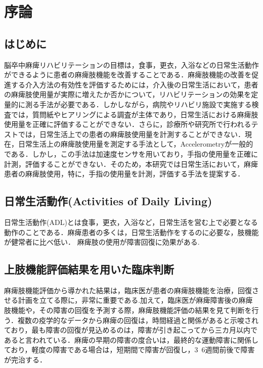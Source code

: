 \chapter{序論}

\section{はじめに}
脳卒中麻痺リハビリテーションの目標は，食事，更衣，入浴などの日常生活動作ができるように患者の麻痺肢機能を改善することである．麻痺肢機能の改善を促進する介入方法の有効性を評価するためには，介入後の日常生活において，患者の麻痺肢使用量が実際に増えたか否かについて，リハビリテーションの効果を定量的に測る手法が必要である．しかしながら，病院やリハビリ施設で実施する検査では，質問紙やヒアリングによる調査が主体であり，日常生活における麻痺肢使用量を正確に評価することができない．さらに，診療所や研究所で行われるテストでは，日常生活上での患者の麻痺肢使用量を計測することができない．現在，日常生活上の麻痺肢使用量を測定する手法として，Accelerometryが一般的である．しかし，この手法は加速度センサを用いており，手指の使用量を正確に計測，評価することができない．そのため，本研究では日常生活において，麻痺患者の麻痺肢使用，特に，手指の使用量を計測，評価する手法を提案する．

\section{日常生活動作(Activities of Daily Living)}
日常生活動作(ADL)とは食事，更衣，入浴など，日常生活を営む上で必要となる動作のことである．麻痺患者の多くは，日常生活動作をするのに必要な，肢機能が健常者に比べ低い．
麻痺肢の使用が障害回復に効果がある\cite{Zeiler2017}.




\section{上肢機能評価結果を用いた臨床判断}
麻痺肢機能評価から導かれた結果は，臨床医が患者の麻痺肢機能を治療，回復させる計画を立てる際に，非常に重要である\cite{Lang2013}.加えて，臨床医が麻痺障害後の麻痺肢機能や，その障害の回復を予測する際，麻痺肢機能評価の結果を見て判断を行う．複数の疫学的なデータから麻痺の回復は，時間経過と関係があると示唆されており，最も障害の回復が見込めるのは，障害が引き起こってから三カ月以内であると言われている．麻痺の早期の障害の度合いは，最終的な運動障害に関係しており，軽度の障害である場合は，短期間で障害が回復し，3~6週間前後で障害が完治する．


